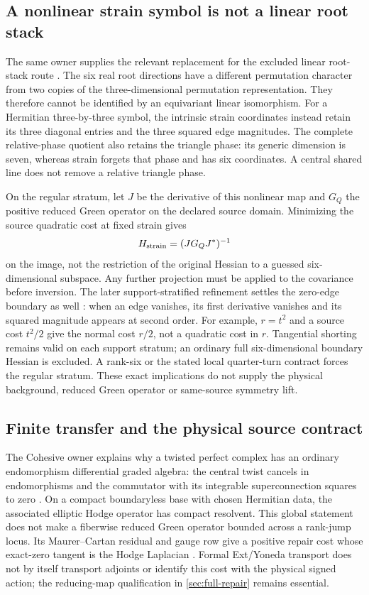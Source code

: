 \documentclass[11pt]{article}
\theoremstyle{definition}
\theoremstyle{remark}
\begin{document}
\subsection{A nonlinear strain symbol is not a linear root stack}
\label{sec:consumer-strain}

The same owner supplies the relevant replacement for the excluded linear
root-stack route \cite{NeroQM2026,ConsumerStrain}. The six real root
directions have a different permutation character from two copies of the
three-dimensional permutation representation. They therefore cannot be
identified by an equivariant linear isomorphism. For a Hermitian
three-by-three symbol, the intrinsic strain coordinates instead retain its
three diagonal entries and the three squared edge magnitudes. The complete
relative-phase quotient also retains the triangle phase: its generic
dimension is seven, whereas strain forgets that phase and has six
coordinates. A central shared line does not remove a relative triangle
phase.

On the regular stratum, let \(J\) be the derivative of this nonlinear map
and \(G_Q\) the positive reduced Green operator on the declared source
domain. Minimizing the source quadratic cost at fixed strain gives
\[
 H_{\rm strain}=(JG_QJ^*)^{-1}
\]
on the image, not the restriction of the original Hessian to a guessed
six-dimensional subspace. Any further projection must be applied to the
covariance before inversion. The later support-stratified refinement
settles the zero-edge boundary as well \cite{ConsumerSupportStrain}:
when an edge vanishes, its first derivative vanishes and its squared
magnitude appears at second order. For example, \(r=t^2\) and a source cost
\(t^2/2\) give the normal cost \(r/2\), not a quadratic cost in \(r\).
Tangential shorting remains valid on each support stratum; an ordinary full
six-dimensional boundary Hessian is excluded. A rank-six or the stated
local quarter-turn contract forces the regular stratum. These exact
implications do not supply the physical background, reduced Green operator
or same-source symmetry lift.

\subsection{Finite transfer and the physical source contract}
\label{sec:consumer-transfer}

The Cohesive owner explains why a twisted perfect complex has an ordinary
endomorphism differential graded algebra: the central twist cancels in
endomorphisms and the commutator with its integrable superconnection
squares to zero \cite{NeroCohesive2026,ConsumerCohesive}. On a compact
boundaryless base with chosen Hermitian data, the associated elliptic
Hodge operator has compact resolvent. This global statement does not make
a fiberwise reduced Green operator bounded across a rank-jump locus.
Its Maurer--Cartan residual and gauge row give a positive repair cost
whose exact-zero tangent is the Hodge Laplacian
\cite{ConsumerMC}. Formal Ext/Yoneda transport does not by itself
transport adjoints or identify this cost with the physical signed action;
the reducing-map qualification in \cref{sec:full-repair} remains essential.
\end{document}
